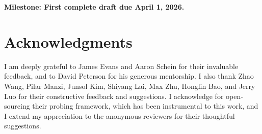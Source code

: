 \documentclass[11pt]{article}
\begin{document}
\textbf{Milestone: First complete draft due April 1, 2026.}

\section*{Acknowledgments}

I am deeply grateful to James Evans and Aaron Schein for their invaluable feedback, and to David Peterson for his generous mentorship. I also thank Zhao Wang, Pilar Manzi, Junsol Kim, Shiyang Lai, Max Zhu, Honglin Bao, and Jerry Luo for their constructive feedback and suggestions. I acknowledge \citet{kimLinearRepresentationsPolitical2025} for open-sourcing their probing framework, which has been instrumental to this work, and I extend my appreciation to the anonymous reviewers for their thoughtful suggestions.

%


\appendix
\end{document}
